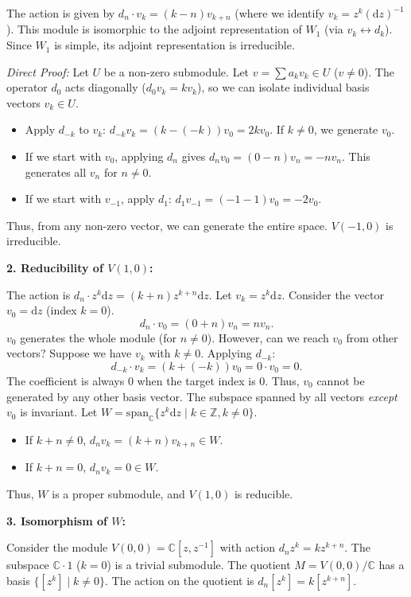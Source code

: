 \documentclass{article}
\newcommand{\C}{\mathbb{C}}
\newcommand{\der}{\mathrm{d}}
\newcommand{\Z}{\mathbb{Z}}
\begin{document}
The action is given by $d_n \cdot v_k = (k - n) v_{k+n}$ (where we identify $v_k = z^k (\der z)^{-1}$). This module is isomorphic to the adjoint representation of $W_1$ (via $v_k \leftrightarrow d_k$). Since $W_1$ is simple, its adjoint representation is irreducible.

\textit{Direct Proof:} Let $U$ be a non-zero submodule. Let $v = \sum a_k v_k \in U$ ($v \neq 0$). The operator $d_0$ acts diagonally ($d_0 v_k = k v_k$), so we can isolate individual basis vectors $v_k \in U$.
\begin{itemize}
    \item Apply $d_{-k}$ to $v_k$: $d_{-k} v_k = (k - (-k)) v_0 = 2k v_0$. If $k \neq 0$, we generate $v_0$.
    \item If we start with $v_0$, applying $d_n$ gives $d_n v_0 = (0-n) v_n = -n v_n$. This generates all $v_n$ for $n \neq 0$.
    \item If we start with $v_{-1}$, apply $d_1$: $d_1 v_{-1} = (-1-1) v_0 = -2 v_0$.
\end{itemize}
Thus, from any non-zero vector, we can generate the entire space. $V(-1, 0)$ is irreducible.

\vspace{0.5cm}

\textbf{2. Reducibility of $V(1, 0)$:}

The action is $d_n \cdot z^k \der z = (k+n) z^{k+n} \der z$. Let $v_k = z^k \der z$.
Consider the vector $v_0 = \der z$ (index $k=0$).
\[ d_n \cdot v_0 = (0+n) v_n = n v_n. \]
$v_0$ generates the whole module (for $n \neq 0$). However, can we reach $v_0$ from other vectors? Suppose we have $v_k$ with $k \neq 0$. Applying $d_{-k}$:
\[ d_{-k} \cdot v_k = (k + (-k)) v_0 = 0 \cdot v_0 = 0. \]
The coefficient is always 0 when the target index is 0. Thus, $v_0$ cannot be generated by any other basis vector. The subspace spanned by all vectors \textit{except} $v_0$ is invariant.
Let $W = \mathrm{span}_{\C} \{ z^k \der z \mid k \in \Z, k \neq 0 \}$.
\begin{itemize}
    \item If $k+n \neq 0$, $d_n v_k = (k+n)v_{k+n} \in W$.
    \item If $k+n = 0$, $d_n v_k = 0 \in W$.
\end{itemize}
Thus, $W$ is a proper submodule, and $V(1, 0)$ is reducible.

\vspace{0.5cm}

\textbf{3. Isomorphism of $W$:}

Consider the module $V(0,0) = \C[z, z^{-1}]$ with action $d_n z^k = k z^{k+n}$. The subspace $\C \cdot 1$ ($k=0$) is a trivial submodule. The quotient $M = V(0,0)/\C$ has a basis $\{ [z^k] \mid k \neq 0 \}$.
The action on the quotient is $d_n [z^k] = k [z^{k+n}]$.
\end{document}
